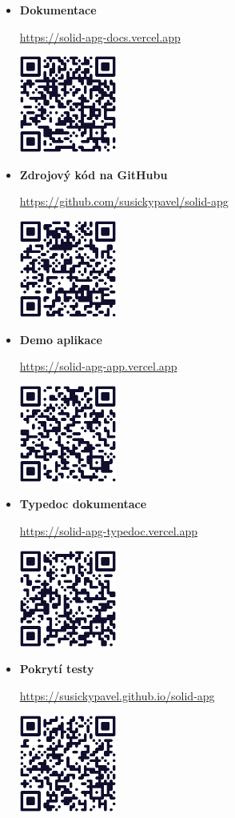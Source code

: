 \begin{itemize}
      \item \textbf{Dokumentace}

            \url{https://solid-apg-docs.vercel.app}

            \includegraphics[width=0.25\textwidth]{assets/figures/qr/docs.png}
      \item \textbf{Zdrojový kód na GitHubu}

            \url{https://github.com/susickypavel/solid-apg}

            \includegraphics[width=0.25\textwidth]{assets/figures/qr/github.png}
      \item \textbf{Demo aplikace}

            \url{https://solid-apg-app.vercel.app}

            \includegraphics[width=0.25\textwidth]{assets/figures/qr/demo.png}
      \item \textbf{Typedoc dokumentace}

            \url{https://solid-apg-typedoc.vercel.app}

            \includegraphics[width=0.25\textwidth]{assets/figures/qr/typedoc.png}
      \item \textbf{Pokrytí testy}

            \url{https://susickypavel.github.io/solid-apg}

            \includegraphics[width=0.25\textwidth]{assets/figures/qr/coverage.png}
\end{itemize}
